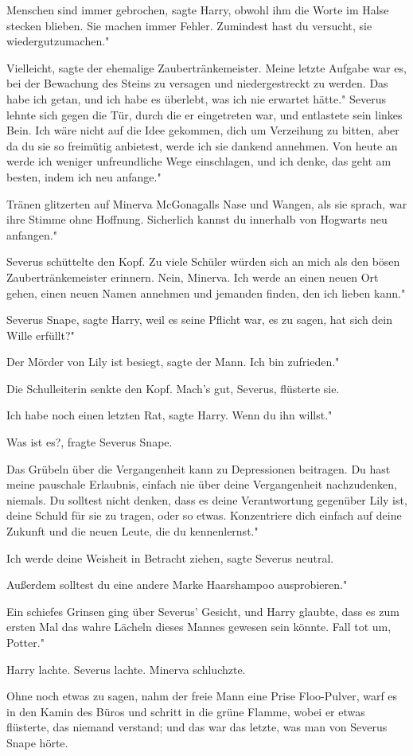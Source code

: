 \glqq Menschen sind immer gebrochen\grqq{}, sagte Harry, obwohl ihm die Worte im
Halse stecken blieben. \glqq Sie machen immer Fehler. Zumindest hast du
versucht, sie wiedergutzumachen."

\glqq Vielleicht\grqq{}, sagte der ehemalige Zaubertränkemeister. \glqq Meine
letzte Aufgabe war es, bei der Bewachung des Steins zu versagen und
niedergestreckt zu werden. Das habe ich getan, und ich habe es überlebt, was ich
nie erwartet hätte." Severus lehnte sich gegen die Tür, durch die er eingetreten
war, und entlastete sein linkes Bein. \glqq Ich wäre nicht auf die Idee
gekommen, dich um Verzeihung zu bitten, aber da du sie so freimütig anbietest,
werde ich sie dankend annehmen. Von heute an werde ich weniger unfreundliche
Wege einschlagen, und ich denke, das geht am besten, indem ich neu anfange."

Tränen glitzerten auf Minerva McGonagalls Nase und Wangen, als sie sprach, war
ihre Stimme ohne Hoffnung. \glqq Sicherlich kannst du innerhalb von Hogwarts neu
anfangen."

Severus schüttelte den Kopf. \glqq Zu viele Schüler würden sich an mich als den
bösen Zaubertränkemeister erinnern. Nein, Minerva. Ich werde an einen neuen Ort
gehen, einen neuen Namen annehmen und jemanden finden, den ich lieben kann."

\glqq Severus Snape\grqq{}, sagte Harry, weil es seine Pflicht war, es zu sagen,
\glqq hat sich dein Wille erfüllt?"

\glqq Der Mörder von Lily ist besiegt\grqq{}, sagte der Mann. \glqq Ich bin
zufrieden."

Die Schulleiterin senkte den Kopf. \glqq Mach's gut, Severus\grqq{}, flüsterte
sie.

\glqq Ich habe noch einen letzten Rat\grqq{}, sagte Harry. \glqq Wenn du ihn
willst."

\glqq Was ist es?\grqq{}, fragte Severus Snape.

\glqq Das Grübeln über die Vergangenheit kann zu Depressionen beitragen. Du hast
meine pauschale Erlaubnis, einfach nie über deine Vergangenheit nachzudenken,
niemals. Du solltest nicht denken, dass es deine Verantwortung gegenüber Lily
ist, deine Schuld für sie zu tragen, oder so etwas. Konzentriere dich einfach
auf deine Zukunft und die neuen Leute, die du kennenlernst."

\glqq Ich werde deine Weisheit in Betracht ziehen\grqq{}, sagte Severus neutral.

\glqq Außerdem solltest du eine andere Marke Haarshampoo ausprobieren."

Ein schiefes Grinsen ging über Severus' Gesicht, und Harry glaubte, dass es zum
ersten Mal das wahre Lächeln dieses Mannes gewesen sein könnte. \glqq Fall tot
um, Potter."

Harry lachte. Severus lachte. Minerva schluchzte.

Ohne noch etwas zu sagen, nahm der freie Mann eine Prise Floo-Pulver, warf es in
den Kamin des Büros und schritt in die grüne Flamme, wobei er etwas flüsterte,
das niemand verstand; und das war das letzte, was man von Severus Snape hörte.

